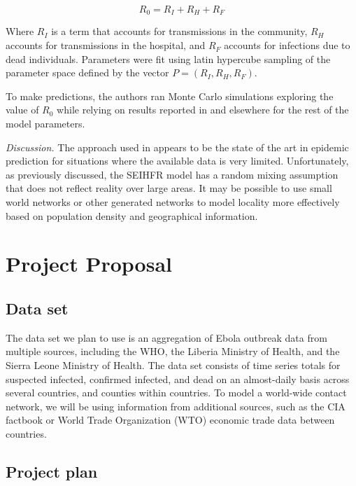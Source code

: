 \documentclass[10pt, journal,onecolumn]{IEEEtran}
\begin{document}
$$
R_0 = R_I + R_H + R_F
$$

Where $R_I$ is a term that accounts for transmissions in the community, $R_H$ accounts for
transmissions in the hospital, and $R_F$ accounts for infections due to dead individuals.
Parameters were fit using latin hypercube sampling of the parameter space defined by the
vector $P = (R_I, R_H, R_F)$.

To make predictions, the authors ran Monte Carlo simulations exploring the value of $R_0$ while relying on results reported
in \citep{legrand2007understanding} and elsewhere for the rest of the model parameters.

\textit{Discussion.} The approach used in \citep{legrand2007understanding} appears to be the state of the art in epidemic prediction for
situations where the available data is very limited. Unfortunately, as previously discussed, the
SEIHFR model has a random mixing assumption that does not reflect reality over large areas.
It may be possible to use small world networks or other generated networks to model locality
more effectively based on population density and geographical information.



\section{Project Proposal}
\label{sec:ProjectProposal}

\subsection{Data set}

The data set we plan to use \citep{cmriversdata} is an aggregation of Ebola outbreak data
from multiple sources, including the WHO, the Liberia Ministry of Health, and the Sierra Leone
Ministry of Health. The data set consists of time series totals for suspected infected, confirmed
infected, and dead on an almost-daily basis across several countries, and counties within countries.
To model a world-wide contact network, we will be using information from additional sources, such
as the CIA factbook or World Trade Organization (WTO) economic trade data between countries.



\subsection{Project plan}
\end{document}
